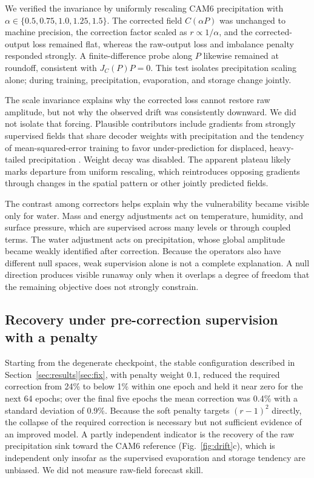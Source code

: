 \documentclass{ametsocV6.1}
\begin{document}
We verified the invariance by uniformly rescaling CAM6 precipitation with $\alpha\in\{0.5,0.75,1.0,1.25,1.5\}$. The corrected field $C(\alpha P)$ was unchanged to machine precision, the correction factor scaled as $r\propto1/\alpha$, and the corrected-output loss remained flat, whereas the raw-output loss and imbalance penalty responded strongly. A finite-difference probe along $P$ likewise remained at roundoff, consistent with $J_C(P)P=0$. This test isolates precipitation scaling alone; during training, precipitation, evaporation, and storage change jointly.

The scale invariance explains why the corrected loss cannot restore raw amplitude, but not why the observed drift was consistently downward. We did not isolate that forcing. Plausible contributors include gradients from strongly supervised fields that share decoder weights with precipitation and the tendency of mean-squared-error training to favor under-prediction for displaced, heavy-tailed precipitation \citep{gilleland2009,subich2025}. Weight decay was disabled. The apparent plateau likely marks departure from uniform rescaling, which reintroduces opposing gradients through changes in the spatial pattern or other jointly predicted fields.

The contrast among correctors helps explain why the vulnerability became visible only for water. Mass and energy adjustments act on temperature, humidity, and surface pressure, which are supervised across many levels or through coupled terms. The water adjustment acts on precipitation, whose global amplitude became weakly identified after correction. Because the operators also have different null spaces, weak supervision alone is not a complete explanation. A null direction produces visible runaway only when it overlaps a degree of freedom that the remaining objective does not strongly constrain.

\subsection{Recovery under pre-correction supervision with a penalty}\label{sec:recovery}

Starting from the degenerate checkpoint, the stable configuration described in Section~\ref{sec:results}\ref{sec:fix}, with penalty weight 0.1, reduced the required correction from 24\% to below 1\% within one epoch and held it near zero for the next 64 epochs; over the final five epochs the mean correction was 0.4\% with a standard deviation of 0.9\%. Because the soft penalty targets $(r-1)^2$ directly, the collapse of the required correction is necessary but not sufficient evidence of an improved model. A partly independent indicator is the recovery of the raw precipitation sink toward the CAM6 reference (Fig.~\ref{fig:drift}c), which is independent only insofar as the supervised evaporation and storage tendency are unbiased. We did not measure raw-field forecast skill.
\end{document}
